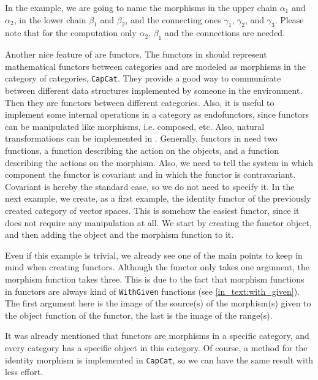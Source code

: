 In the example, we are going to name the morphisms in the upper chain $\alpha_1$ and $\alpha_2$, in the lower chain $\beta_1$ and $\beta_2$,
and the connecting ones $\gamma_1$, $\gamma_2$, and $\gamma_3$. Please note that for the computation only $\alpha_2$, $\beta_1$ and the connections
are needed.

\begin{small}
 
\end{small}

Another nice feature of \CapPkg are functors. The functors in \CapPkg should represent mathematical functors between categories and are modeled
as morphisms in the \CapPkg category of categories, \texttt{CapCat}. They provide a good way to communicate between different data structures implemented
by someone in the \CapPkg environment. Then they are functors between different categories. Also, it is useful to implement some internal operations
in a category as endofunctors, since functors can be manipulated like morphisms, i.e. composed, etc. Also, natural transformations can be implemented in
\CapPkg. Generally, functors in \CapPkg need two functions, a function describing the action on the objects, and a function describing the actions on the
morphism. Also, we need to tell the system in which component the functor is covariant and in which the functor is contravariant. Covariant is hereby the standard
case, so we do not need to specify it.
In the next example, we create, as a first example, the identity functor of the previously created category of vector spaces. This is somehow the easiest functor,
since it does not require any manipulation at all. We start by creating the functor object, and then adding the object and the morphism function to it.

\begin{small}
 
\end{small}

Even if this example is trivial, we already see one of the main points to keep in mind when creating functors. Although the functor only takes one argument,
the morphism function takes three. This is due to the fact that morphism functions in functors are always kind of \texttt{WithGiven} functions
(see \ref{in_text:with_given}). The first
argument here is the image of the source(s) of the morphism(s) given to the object function of the functor, the last is the image of the range(s).

It was already mentioned that functors are morphisms in a specific category, and every \CapPkg category has a specific object in this category.
Of course, a method for the identity morphism is implemented in \texttt{CapCat}, so we can have the same result with less effort.

